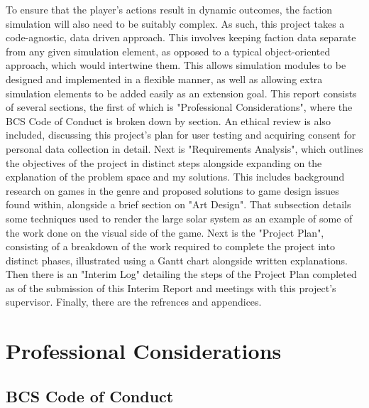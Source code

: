 \documentclass{report}
\begin{document}
To ensure that the player's actions result in dynamic outcomes, the faction simulation will also need to be suitably complex. As such, this project takes a code-agnostic, data driven approach. This involves keeping faction data separate from any given simulation element, as opposed to a typical object-oriented approach, which would intertwine them. This allows simulation modules to be designed and implemented in a flexible manner, as well as allowing extra simulation elements to be added easily as an extension goal.
\newline
\newline
This report consists of several sections, the first of which is "Professional Considerations", where the BCS Code of Conduct is broken down by section. An ethical review is also included, discussing this project's plan for user testing and acquiring consent for personal data collection in detail. Next is "Requirements Analysis", which outlines the objectives of the project in distinct steps alongside expanding on the explanation of the problem space and my solutions. This includes background research on games in the genre and proposed solutions to game design issues found within, alongside a brief section on "Art Design". That subsection details some techniques used to render the large solar system as an example of some of the work done on the visual side of the game.
Next is the "Project Plan", consisting of a breakdown of the work required to complete the project into distinct phases, illustrated using a Gantt chart alongside written explanations. Then there is an "Interim Log" detailing the steps of the Project Plan completed as of the submission of this Interim Report and meetings with this project's supervisor. Finally, there are the refrences and appendices.

\chapter{Professional Considerations}

\section{BCS Code of Conduct}
\end{document}
